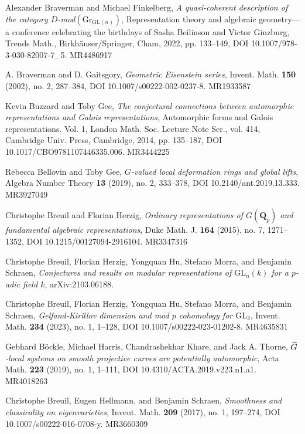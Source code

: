 \item[{[BF22]}] Alexander Braverman and Michael Finkelberg, \emph{A quasi-coherent description of the category $D$-mod$(\mathrm{Gr}_{\mathrm{GL}(n)})$}, Representation theory and algebraic geometry---a conference celebrating the birthdays of Sasha Beilinson and Victor Ginzburg, Trends Math., Birkh\"auser/Springer, Cham, 2022, pp. 133--149, DOI 10.1007/978-3-030-82007-7\_5. MR4486917
\item[{[BG02]}] A. Braverman and D. Gaitsgory, \emph{Geometric Eisenstein series}, Invent. Math. \textbf{150} (2002), no. 2, 287--384, DOI 10.1007/s00222-002-0237-8. MR1933587
\item[{[BG14]}] Kevin Buzzard and Toby Gee, \emph{The conjectural connections between automorphic representations and Galois representations}, Automorphic forms and Galois representations. Vol. 1, London Math. Soc. Lecture Note Ser., vol. 414, Cambridge Univ. Press, Cambridge, 2014, pp. 135--187, DOI 10.1017/CBO9781107446335.006. MR3444225
\item[{[BG19]}] Rebecca Bellovin and Toby Gee, \emph{$G$-valued local deformation rings and global lifts}, Algebra Number Theory \textbf{13} (2019), no. 2, 333--378, DOI 10.2140/ant.2019.13.333. MR3927049
\item[{[BH15]}] Christophe Breuil and Florian Herzig, \emph{Ordinary representations of $G(\mathbf{Q}_p)$ and fundamental algebraic representations}, Duke Math. J. \textbf{164} (2015), no. 7, 1271--1352, DOI 10.1215/00127094-2916104. MR3347316
\item[{[BHH+21]}] Christophe Breuil, Florian Herzig, Yongquan Hu, Stefano Morra, and Benjamin Schraen, \emph{Conjectures and results on modular representations of $\mathrm{GL}_n(k)$ for a $p$-adic field $k$}, arXiv:2103.06188.
\item[{[BHH+23]}] Christophe Breuil, Florian Herzig, Yongquan Hu, Stefano Morra, and Benjamin Schraen, \emph{Gelfand-Kirillov dimension and mod $p$ cohomology for $\mathrm{GL}_2$}, Invent. Math. \textbf{234} (2023), no. 1, 1--128, DOI 10.1007/s00222-023-01202-8. MR4635831
\item[{[BHKT19]}] Gebhard B\"ockle, Michael Harris, Chandrashekhar Khare, and Jack A. Thorne, \emph{$\widehat{G}$-local systems on smooth projective curves are potentially automorphic}, Acta Math. \textbf{223} (2019), no. 1, 1--111, DOI 10.4310/ACTA.2019.v223.n1.a1. MR4018263
\item[{[BHS17a]}] Christophe Breuil, Eugen Hellmann, and Benjamin Schraen, \emph{Smoothness and classicality on eigenvarieties}, Invent. Math. \textbf{209} (2017), no. 1, 197--274, DOI 10.1007/s00222-016-0708-y. MR3660309
